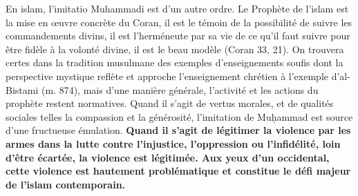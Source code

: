 En islam, l'imitatio Muhammadi est d'un autre ordre. Le Prophète de
l'islam est la mise en œuvre concrète du Coran, il est le témoin de la
possibilité de suivre les commandements divins, il est l'herméneute par
sa vie de ce qu'il faut suivre pour être fidèle à la volonté divine, il
est le beau modèle (Coran 33, 21). On trouvera certes dans la tradition
musulmane des exemples d'enseignements soufis dont la perspective
mystique reflète et approche l'enseignement chrétien à l'exemple
d'al-Bistami (m. 874), mais d'une manière générale, l'activité et les
actions du prophète restent normatives. Quand il s'agit de vertus
morales, et de qualités sociales telles la compassion et la générosité,
l'imitation de Muḥammad est source d'une fructueuse émulation.
\textbf{Quand il s'agit de légitimer la violence par les armes dans la
lutte contre l'injustice, l'oppression ou l'infidélité, loin d'être
écartée, la violence est légitimée. Aux yeux d'un occidental, cette
violence est hautement problématique et constitue le défi majeur de
l'islam contemporain.}



